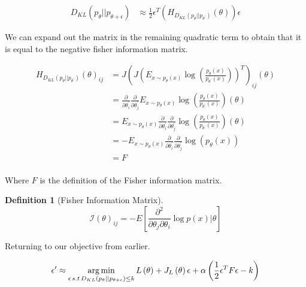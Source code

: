 \documentclass[12pt, a4paper]{report}
\theoremstyle{definition}
\theoremstyle{definition}
\newtheorem{definition}{Definition}[section]
\theoremstyle{definition}
\begin{document}
\begin{align}
    D_{KL} \left(p_\theta || p_{\theta + \epsilon} \right) &\approx  \frac{1}{2} \epsilon^T \left( H_{D_{KL} \left(p_\theta || p_{\theta^\prime} \right)}\left( \theta \right) \right) \epsilon
\end{align}


We can expand out the matrix in the remaining quadratic term to obtain that it is equal to the negative fisher information matrix.

\begin{align}
    H_{D_{KL} \left(p_\theta || p_{\theta^\prime} \right)}\left( \theta \right)_{ij} &= J \left( J \left( E_{x \sim p_\theta(x)}  \log \left( \frac{p_\theta(x)}{p_{\theta^\prime}(x)}\right)\right)^T \right)_{ij} \left( \theta \right) \\
    &= \frac{\partial}{\partial \theta^\prime_i} \frac{\partial}{\partial \theta^\prime_j} E_{x \sim p_\theta(x)}  \log \left( \frac{p_\theta(x)}{p_{\theta^\prime}(x)}\right) \left( \theta \right) \\
    &= E_{x \sim p_\theta(x)} \frac{\partial}{\partial \theta^\prime_i} \frac{\partial}{\partial \theta^\prime_j}  \log \left( \frac{p_\theta(x)}{p_{\theta^\prime}(x)}\right) \left( \theta \right) \\
    &= - E_{x \sim p_\theta(x)} \frac{\partial}{\partial \theta^\prime_i} \frac{\partial}{\partial \theta^\prime_j}  \log \left( p_{\theta}(x) \right)  \\
    &= F \\
\end{align}

Where $F$ is the definition of the Fisher information matrix.


\begin{definition}[Fisher Information Matrix]
    $$\mathcal{I} \left( \theta\right)_{ij} = - E \left[ \frac{\partial^2}{\partial \theta_j  \partial \theta_i }  \log p \left(x  \right)\big| \theta \right]$$
\end{definition}

Returning to our objective from earlier.

\begin{align}
    \epsilon^\prime &\approx \operatorname*{arg\,min}_{\epsilon \, s.t \, D_{KL} \left(p_\theta || p_{\theta + \epsilon} \right) \leq k}  L\left( \theta \right) +  J_L \left( \theta\right) \epsilon  + \alpha \left( \frac{1}{2} \epsilon^T F \epsilon - k\right) \\
\end{align}
\end{document}
